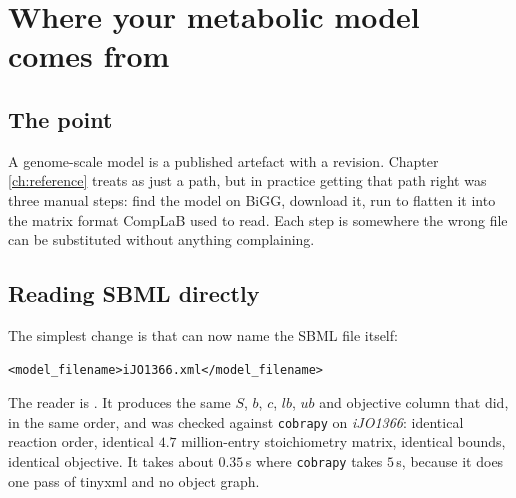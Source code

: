 
\chapter{Where your metabolic model comes from}
\label{ch:modelsource}

\section{The point}

A genome-scale model is a published artefact with a revision. Chapter
\ref{ch:reference} treats  as just a path, but in practice
getting that path right was three manual steps: find the model on BiGG,
download it, run  to flatten it into the matrix format
CompLaB used to read. Each step is somewhere the wrong file can be substituted
without anything complaining.

\section{Reading SBML directly}

The simplest change is that  can now name the SBML file
itself:

\begin{lstlisting}[style=xml]
<model_filename>iJO1366.xml</model_filename>
\end{lstlisting}

The reader is . It produces the same
$S$, $b$, $c$, $lb$, $ub$ and objective column that  did, in
the same order, and was checked against \texttt{cobrapy} on \emph{iJO1366}:
identical reaction order, identical $4.7$ million-entry stoichiometry matrix,
identical bounds, identical objective. It takes about $0.35$\,s where
\texttt{cobrapy} takes $5$\,s, because it does one pass of tinyxml and no
object graph.


